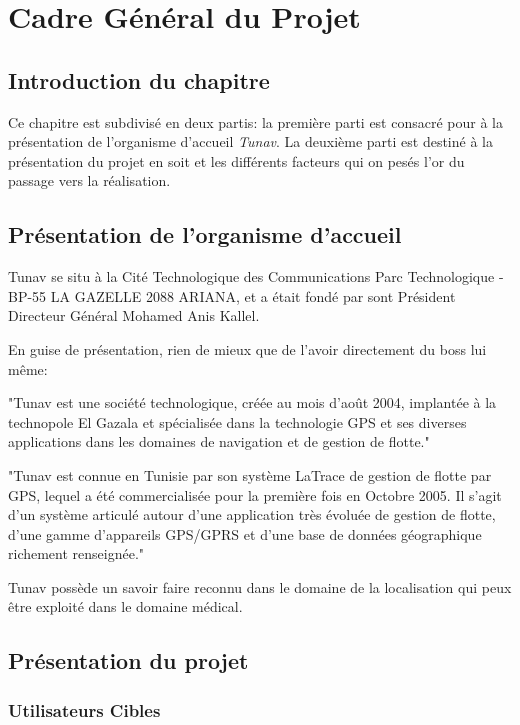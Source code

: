 
\chapter{Cadre Général du Projet}
\section{Introduction du chapitre}
Ce chapitre est subdivisé en deux partis: la première parti est consacré pour à la présentation de l'organisme d'accueil \textit{Tunav}. La deuxième parti est destiné à la présentation du projet en soit et les différents facteurs qui on pesés l'or du passage vers la réalisation.

\section{Présentation de l'organisme d'accueil}  

Tunav se situ à la Cité Technologique des Communications Parc Technologique
-BP-55 LA GAZELLE 2088 ARIANA, et a était fondé par sont Président Directeur
Général Mohamed Anis Kallel.

En guise de présentation, rien de mieux que de l'avoir directement du boss lui
même\cite{index_tunisie}:

"Tunav est une société technologique, créée au mois d'août 2004, implantée à la
technopole El Gazala et spécialisée dans la technologie GPS et ses diverses
applications dans les domaines de navigation et de gestion de flotte."

"Tunav est connue en Tunisie par son système \og{}LaTrace\fg{} de gestion de
flotte par GPS, lequel a été commercialisée pour la première fois en Octobre
2005. Il s'agit d'un système articulé autour d'une application très évoluée de
gestion de flotte, d'une gamme d'appareils GPS/GPRS et d'une base de données
géographique richement renseignée."

Tunav possède un savoir faire reconnu dans le domaine de la localisation qui peux être exploité dans le domaine médical.

\section{Présentation du projet}

\subsection{Utilisateurs Cibles}

